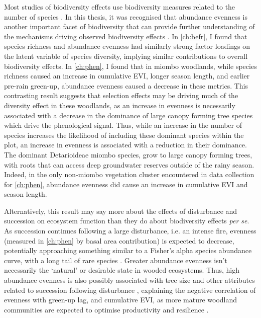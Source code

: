 \begin{refsection}
Most studies of biodiversity effects use biodiversity measures related to the number of species \citep{Tilman2014}. In this thesis, it was recognised that abundance evenness is another important facet of biodiversity that can provide further understanding of the mechanisms driving observed biodiversity effects \citep{Chalcraft2004}. In \autoref{ch:befr}, I found that species richness and abundance evenness had similarly strong factor loadings on the latent variable of species diversity, implying similar contributions to overall biodiversity effects. In \autoref{ch:phen}, I found that in miombo woodlands, while species richness caused an increase in cumulative EVI, longer season length, and earlier pre-rain green-up, abundance evenness caused a decrease in these metrics. This contrasting result suggests that selection effects may be driving much of the diversity effect in these woodlands, as an increase in evenness is necessarily associated with a decrease in the dominance of large canopy forming tree species which drive the phenological signal. Thus, while an increase in the number of species increases the likelihood of including these dominant species within the plot, an increase in evenness is associated with a reduction in their dominance. The dominant Detarioideae miombo species, grow to large canopy forming trees, with roots that can access deep groundwater reserves outside of the rainy season. Indeed, in the only non-miombo vegetation cluster encountered in data collection for \autoref{ch:phen}, abundance evenness did cause an increase in cumulative EVI and season length.

Alternatively, this result may say more about the effects of disturbance and succession on ecosystem function than they do about biodiversity effects \textit{per se}. As succession continues following a large disturbance, i.e. an intense fire, evenness (measured in \autoref{ch:phen} by basal area contribution) is expected to decrease, potentially approaching something similar to a Fisher's alpha species abundance curve, with a long tail of rare species \citep{Morozov2008, Sheil2001}. Greater abundance evenness isn't necessarily the `natural' or desirable state in wooded ecosystems. Thus, high abundance evenness is also possibly associated with tree size and other attributes related to succession following disturbance \citep{Holdo2006}, explaining the negative correlation of evenness with green-up lag, and cumulative EVI, as more mature woodland communities are expected to optimise productivity and resilience \citep{Hector2007}.


\end{refsection}
